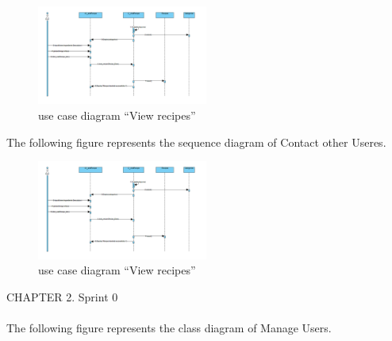 \documentclass{article}
\begin{document}
{{{{{{{{\begin{figure}[htbp]
    \centering
    \includegraphics[width=0.5\textwidth]{adddia}
    \caption{use case diagram “View recipes”}
    \label{fig:design2}
\end{figure}
The following figure represents the sequence diagram of Contact other Useres.\\
\begin{figure}[htbp]
    \centering
    \includegraphics[width=0.5\textwidth]{adddia}
    \caption{use case diagram “View recipes”}
    \label{fig:design2}
\end{figure}
\newpage
\noindent
CHAPTER 2.  Sprint 0 \\
\underline{\hspace{\textwidth}} \vspace{0.2cm}\\
The following figure represents the class diagram of Manage Users.\\

}}}}}}}}
\end{document}
